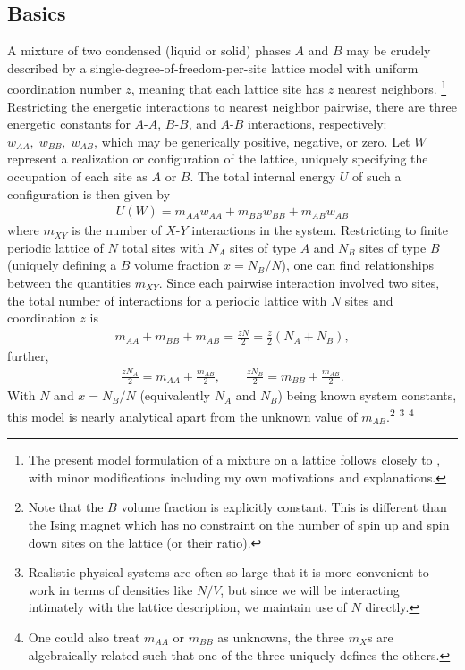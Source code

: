 \documentclass[10pt]{article}
\begin{document}
\subsection{Basics}
A mixture of two condensed (liquid or solid) phases $A$ and $B$ may be crudely described by a single-degree-of-freedom-per-site lattice model with uniform coordination number $z$, meaning that each lattice site has $z$ nearest neighbors. \footnote{The present model formulation of a mixture on a lattice follows closely to \cite{dill}, with minor modifications including my own motivations and explanations.} 
Restricting the energetic interactions to nearest neighbor pairwise, there are three energetic constants for $A$-$A$, $B$-$B$, and $A$-$B$ interactions, respectively: $w_{AA}, \; w_{BB}, \; w_{AB}$, which may be generically positive, negative, or zero.
Let $W$ represent a realization or configuration of the lattice, uniquely specifying the occupation of each site as $A$ or $B$.
The total internal energy $U$ of such a configuration is then given by
\begin{align}
    U(W) = m_{AA} w_{AA} + m_{BB} w_{BB} + m_{AB} w_{AB}
\end{align}
where $m_{XY}$ is the number of $X$-$Y$ interactions in the system.
Restricting to finite periodic lattice of $N$ total sites with $N_A$ sites of type $A$ and $N_B$ sites of type $B$ (uniquely defining a $B$ volume fraction $x = N_B / N$), one can find relationships between the quantities $m_{XY}$.
Since each pairwise interaction involved two sites, the total number of interactions for a periodic lattice with $N$ sites and coordination $z$ is
\begin{align}
    m_{AA} + m_{BB} + m_{AB} = \frac{z N}{2} = \frac{z}{2} \left( N_A + N_B \right),
\end{align}
further,
\begin{align}
    \frac{z N_A}{2} = m_{AA} + \frac{m_{AB}}{2}, \quad\quad
    \frac{z N_B}{2} = m_{BB} + \frac{m_{AB}}{2}.
\end{align}
With $N$ and $x=N_B/N$ (equivalently $N_A$ and $N_B$) being known system constants, this model is nearly analytical apart from the unknown value of $m_{AB}$.\footnote{Note that the $B$ volume fraction is explicitly constant. This is different than the Ising magnet which has no constraint on the number of spin up and spin down sites on the lattice (or their ratio).}
\footnote{Realistic physical systems are often so large that it is more convenient to work in terms of densities like $N/V$, but since we will be interacting intimately with the lattice description, we maintain use of $N$ directly.} \footnote{One could also treat $m_{AA}$ or $m_{BB}$ as unknowns, the three $m_{X}$s are algebraically related such that one of the three uniquely defines the others.}
\end{document}
